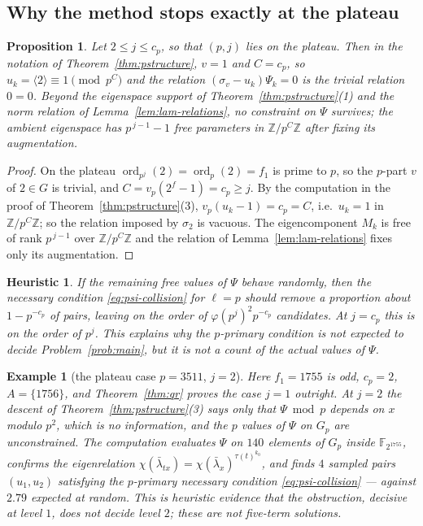 \documentclass[a4paper]{article}
\newtheorem{proposition}[theorem]{Proposition}
\newtheorem{example}[theorem]{Example}
\newtheorem{heuristic}[theorem]{Heuristic}
\newcommand{\F}{\mathbb{F}}
\newcommand{\Z}{\mathbb{Z}}
\newcommand{\ord}[2][]{\operatorname{ord}_{#1}\!\left(#2\right)}
\begin{document}
\subsection{Why the method stops exactly at the plateau}

\begin{proposition}\label{prop:plateau-degenerate}
	Let $2\leq j\leq c_p$, so that $(p,j)$ lies on the plateau.  Then in
	the notation of Theorem~\ref{thm:pstructure}, $v=1$ and $C=c_p$, so
	$u_k=\langle2\rangle\equiv1\pmod{p^{C}}$ and the relation
	$(\sigma_v-u_k)\Psi_k=0$ is the trivial relation $0=0$.
	Beyond the eigenspace support of Theorem~\ref{thm:pstructure}(1) and
	the norm relation of Lemma~\ref{lem:lam-relations}, no constraint on
	$\Psi$ survives; the ambient eigenspace has $p^{\,j-1}-1$ free
	parameters in $\Z/p^{C}\Z$ after fixing its augmentation.
\end{proposition}

\begin{proof}
	On the plateau $\ord[p^j]{2}=\ord[p]{2}=f_1$ is prime to $p$, so the
	$p$-part $v$ of $2\in G$ is trivial, and
	$C=v_p(2^{f}-1)=c_p\geq j$.
	By the computation in the proof of
	Theorem~\ref{thm:pstructure}(3),
	$v_p(u_k-1)=c_p=C$, i.e.\ $u_k=1$ in $\Z/p^{C}\Z$; so the relation
	imposed by $\sigma_2$ is vacuous.  The eigencomponent $M_k$ is free of
	rank $p^{\,j-1}$ over $\Z/p^{C}\Z$ and the relation of
	Lemma~\ref{lem:lam-relations} fixes only its augmentation.
\end{proof}

\begin{heuristic}
	If the remaining free values of $\Psi$ behave randomly, then the
	necessary condition \eqref{eq:psi-collision} for $\ell=p$ should remove
	a proportion about $1-p^{-c_p}$ of pairs, leaving on the order of
	$\varphi(p^j)^2p^{-c_p}$ candidates. At $j=c_p$ this is on the order of
	$p^j$. This explains why the $p$-primary condition is not expected to
	decide Problem~\ref{prob:main}, but it is not a count of the actual
	values of $\Psi$.
\end{heuristic}

\begin{example}[the plateau case $p=3511$, $j=2$]\label{ex:3511-plateau}
	Here $f_1=1755$ is odd, $c_p=2$, $A=\{1756\}$, and
	Theorem~\ref{thm:qr} proves the case $j=1$ outright.  At $j=2$ the
	descent of Theorem~\ref{thm:pstructure}(3) says only that
	$\Psi\bmod p$ depends on $x$ modulo $p^{2}$, which is no information,
	and the $p$ values of $\Psi$ on $G_p$ are unconstrained.
	The computation 
	evaluates $\Psi$ on $140$ elements of $G_p$ inside
	$\F_{2^{1755}}$, confirms the eigenrelation
	$\chi(\bar\lambda_{tx})=\chi(\bar\lambda_x)^{\tau(t)^{k_0}}$, and finds
	$4$ sampled pairs $(u_1,u_2)$ satisfying the $p$-primary necessary
	condition \eqref{eq:psi-collision} --- against $2.79$ expected at random.
	This is heuristic evidence that the obstruction, decisive at level $1$,
	does not decide level $2$; these are not five-term solutions.
\end{example}
\end{document}
